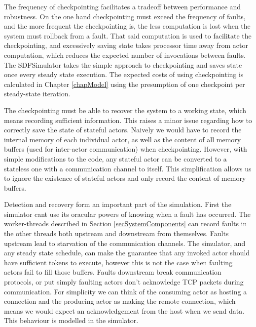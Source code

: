 The frequency of checkpointing facilitates a tradeoff between performance and robustness.
On the one hand checkpointing must exceed the frequency of faults, and the more frequent the checkpointing is, the less computation is lost when the system must rollback from a fault.
That said computation is used to facilitate the checkpointing, and excessively saving state takes processor time away from actor computation, which reduces the expected number of invocations between faults.
The SDFSimulator takes the simple approach to checkpointing and saves state once every steady state execution.
The expected costs of using checkpointing is calculated in Chapter \ref{chapModel} using the presumption of one checkpoint per steady-state iteration.

The checkpointing must be able to recover the system to a working state, which means recording sufficient information.
This raises a minor issue regarding how to correctly save the state of stateful actors.
Naively we would have to record the internal memory of each individual actor, as well as the content of all memory buffers (used for inter-actor communication) when checkpointing.
However, with simple modifications to the code, any stateful actor can be converted to a stateless one with a communication channel to itself.
This simplification allows us to ignore the existence of stateful actors and only record the content of memory buffers.

Detection and recovery form an important part of the simulation.
First the simulator cant use its oracular powers of knowing when a fault has occurred.
The worker-threads described in Section \ref{secSystemComponents} can record faults in the other threads both upstream and downstream from themselves.
Faults upstream lead to starvation of the communication channels.
The simulator, and any steady state schedule, can make the guarantee that any invoked actor should have sufficient tokens to execute, however this is not the case when faulting actors fail to fill those buffers.
Faults downstream break communication protocols, or put simply faulting actors don't acknowledge TCP packets during communication.
For simplicity we can think of the consuming actor as hosting a connection and the producing actor as making the remote connection, which means we would expect an acknowledgement from the host when we send data.
This behaviour is modelled in the simulator.

